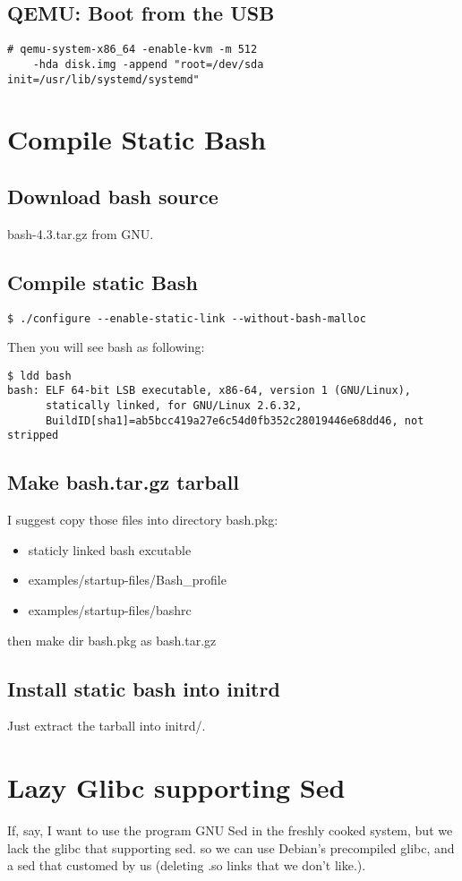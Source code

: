 \documentclass[10pt,a4paper]{article}
\begin{document}
\subsection{QEMU: Boot from the USB}
\begin{verbatim}
# qemu-system-x86_64 -enable-kvm -m 512
    -hda disk.img -append "root=/dev/sda init=/usr/lib/systemd/systemd"
\end{verbatim}

\section{Compile Static Bash}
\subsection{Download bash source}
bash-4.3.tar.gz from GNU.
\subsection{Compile static Bash}
\begin{verbatim}
$ ./configure --enable-static-link --without-bash-malloc
\end{verbatim}
Then you will see bash as following:
\begin{verbatim}
$ ldd bash
bash: ELF 64-bit LSB executable, x86-64, version 1 (GNU/Linux), 
      statically linked, for GNU/Linux 2.6.32, 
      BuildID[sha1]=ab5bcc419a27e6c54d0fb352c28019446e68dd46, not stripped
\end{verbatim}
\subsection{Make bash.tar.gz tarball}
I suggest copy those files into directory bash.pkg:
\begin{itemize}
\item staticly linked bash excutable
\item examples/startup-files/Bash\_profile
\item examples/startup-files/bashrc
\end{itemize}
then make dir bash.pkg as bash.tar.gz
\subsection{Install static bash into initrd}
Just extract the tarball into initrd/.

\section{Lazy Glibc supporting Sed}
If, say, I want to use the program GNU Sed in the freshly cooked system,
but we lack the glibc that supporting sed. so we can use Debian's precompiled glibc,
and a sed that customed by us (deleting .so links that we don't like.).
\end{document}
